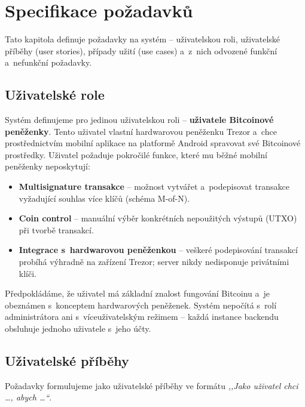 
\chapter{Specifikace požadavků}
\label{chap:specifikace}

Tato kapitola definuje požadavky na systém -- uživatelskou roli, uživatelské
příběhy (user stories), případy užití (use cases) a~z~nich odvozené funkční
a~nefunkční požadavky.

\section{Uživatelské role}
\label{sec:role}

Systém definujeme pro jedinou uživatelskou roli -- \textbf{uživatele Bitcoinové
peněženky}. Tento uživatel vlastní hardwarovou peněženku Trezor a~chce prostřednictvím
mobilní aplikace na platformě Android spravovat své Bitcoinové prostředky. Uživatel
požaduje pokročilé funkce, které mu běžné mobilní peněženky neposkytují:

\begin{itemize}
  \item \textbf{Multisignature transakce} -- možnost vytvářet a~podepisovat transakce
        vyžadující souhlas více klíčů (schéma M-of-N).
  \item \textbf{Coin control} -- manuální výběr konkrétních nepoužitých výstupů
        (UTXO) při tvorbě transakcí.
  \item \textbf{Integrace s~hardwarovou peněženkou} -- veškeré podepisování transakcí
        probíhá výhradně na zařízení Trezor; server nikdy nedisponuje privátními klíči.
\end{itemize}

Předpokládáme, že uživatel má základní znalost fungování Bitcoinu a~je obeznámen
s~konceptem hardwarových peněženek. Systém nepočítá s~rolí administrátora ani
s~víceuživatelským režimem -- každá instance backendu obsluhuje jednoho uživatele
s~jeho účty.

\section{Uživatelské příběhy}
\label{sec:user-stories}

Požadavky formulujeme jako uživatelské příběhy ve formátu
\emph{,,Jako uživatel chci \ldots, abych \ldots``}.

